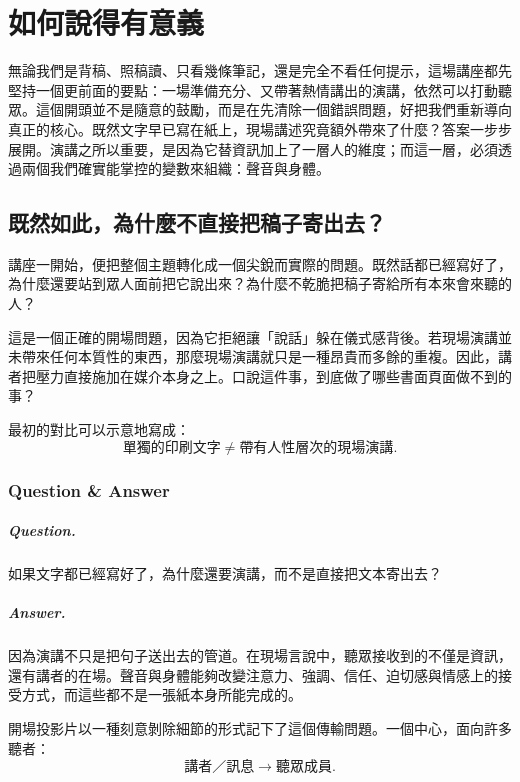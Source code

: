 \chapter{如何說得有意義}

無論我們是背稿、照稿讀、只看幾條筆記，還是完全不看任何提示，這場講座都先堅持一個更前面的要點：一場準備充分、又帶著熱情講出的演講，依然可以打動聽眾。這個開頭並不是隨意的鼓勵，而是在先清除一個錯誤問題，好把我們重新導向真正的核心。既然文字早已寫在紙上，現場講述究竟額外帶來了什麼？答案一步步展開。演講之所以重要，是因為它替資訊加上了一層人的維度；而這一層，必須透過兩個我們確實能掌控的變數來組織：聲音與身體。

\section{既然如此，為什麼不直接把稿子寄出去？}

講座一開始，便把整個主題轉化成一個尖銳而實際的問題。既然話都已經寫好了，為什麼還要站到眾人面前把它說出來？為什麼不乾脆把稿子寄給所有本來會來聽的人？

這是一個正確的開場問題，因為它拒絕讓「說話」躲在儀式感背後。若現場演講並未帶來任何本質性的東西，那麼現場演講就只是一種昂貴而多餘的重複。因此，講者把壓力直接施加在媒介本身之上。口說這件事，到底做了哪些書面頁面做不到的事？

最初的對比可以示意地寫成：
\begin{equation}
\text{單獨的印刷文字} \neq \text{帶有人性層次的現場演講}.
\end{equation}

\subsection{Question \& Answer}

\paragraph{Question.} 如果文字都已經寫好了，為什麼還要演講，而不是直接把文本寄出去？

\paragraph{Answer.} 因為演講不只是把句子送出去的管道。在現場言說中，聽眾接收到的不僅是資訊，還有講者的在場。聲音與身體能夠改變注意力、強調、信任、迫切感與情感上的接受方式，而這些都不是一張紙本身所能完成的。

開場投影片以一種刻意剝除細節的形式記下了這個傳輸問題。一個中心，面向許多聽者：
\begin{equation}
\text{講者／訊息} \longrightarrow \text{聽眾成員}.
\end{equation}

